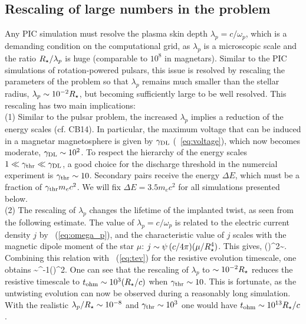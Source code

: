 \subsection{Rescaling of large numbers in the problem}
\label{sec:rescale}

Any PIC simulation must resolve the plasma skin depth $\lambda_p=c/\omega_p$,
which is a demanding condition on the computational grid, as $\lambda_p$ is a
microscopic scale and the ratio $R_\star/\lambda_p$ is huge (comparable to $10^8$ in
magnetars). Similar to the PIC simulations of rotation-powered pulsars, this
issue is resolved by rescaling the parameters of the problem so that $\lambda_p$
remains much smaller than the stellar radius, $\lambda_p\sim 10^{-2}R_\star$,
but becoming
sufficiently large to be well resolved. This rescaling has two
main implications:
\\
(1) Similar to the pulsar problem, the increased $\lambda_p$ implies a reduction
of the energy scales (cf. CB14). In particular, the maximum voltage that can be
induced in a magnetar magnetosphere is given by $\gamma_{\rm DL}$ (\Eq~\ref{eq:voltage}),
which now becomes moderate, $\gamma_{\rm DL}\sim 10^2$. To respect the hierarchy of the
energy scales $1\ll\gamma_{\rm thr}\ll\gamma_{\rm DL}$, a good choice for the discharge threshold in
the numercial experiment is $\gamma_{\rm thr}\sim 10$. Secondary pairs receive the energy
$\Delta E$, which must be a fraction of $\gamma_{\rm thr} m_ec^2$. We will fix $\Delta
E=3.5 m_ec^2$ for all simulations presented below.
\\
(2) The rescaling of $\lambda_p$ changes the lifetime of the implanted twist, as
seen from the following estimate. The value of $\lambda_p=c/\omega_p$ is related
to the electric current density $j$ by \Eq~(\ref{eq:omega_p}), and the
characteristic value of $j$ scales with the magnetic dipole moment of the star
$\mu$: $j\sim \psi\, (c/4\pi)(\mu/R_\star^4)$. This gives, \beq
\label{eq:mu}
  \left(\right)^2\sim {}.
\eeq
Combining this relation with \Eq~(\ref{eq:tev}) for the resistive evolution timescale, one obtains
\beq
\label{eq:tev1}
   \tev\sim\gthr^{-1}\left(\right)^2.
\eeq
One can see that the rescaling of $\lambda_p$ to $\sim 10^{-2}R_\star$ reduces the
resistive timescale to $t_{\rm ohm}\sim 10^3(R_\star/c)$ when $\gamma_{\rm thr}\sim 10$. This is fortunate,
as the untwisting evolution can now be observed during a reasonably long simulation.
With the realistic $\lambda_p/R_\star\sim 10^{-8}$ and $\gamma_{\rm thr}\sim 10^3$
one would have $t_{\rm ohm}\sim 10^{13}R_\star/c$.

